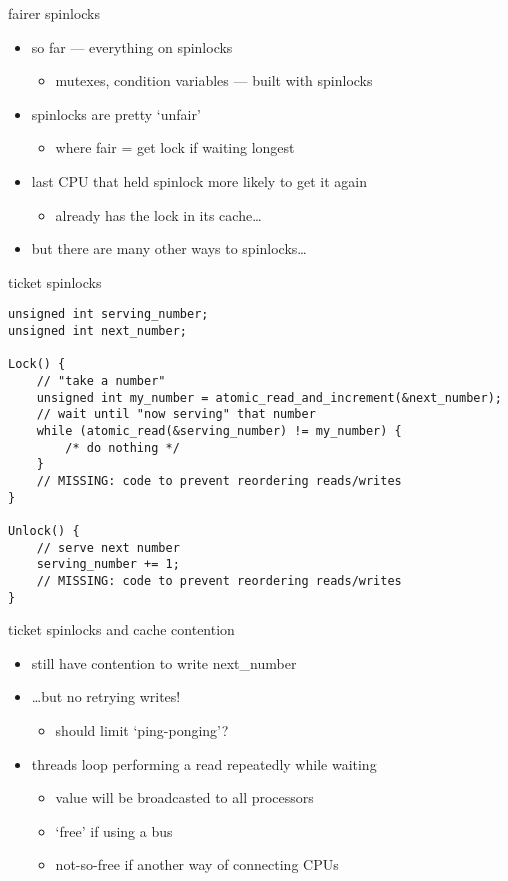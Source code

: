 \begin{frame}{fairer spinlocks}
\begin{itemize}
\item so far --- everything on spinlocks
    \begin{itemize}
    \item mutexes, condition variables --- built with spinlocks
    \end{itemize}
\item spinlocks are pretty `unfair'
    \begin{itemize}
    \item where fair = get lock if waiting longest
    \end{itemize}
\item last CPU that held spinlock more likely to get it again
    \begin{itemize}
    \item already has the lock in its cache\ldots
    \end{itemize}
\item but there are many other ways to spinlocks\ldots
\end{itemize}
\end{frame}

\begin{frame}[fragile,label=ticketLock]{ticket spinlocks}
\begin{lstlisting}
unsigned int serving_number;
unsigned int next_number;

Lock() {
    // "take a number"
    unsigned int my_number = atomic_read_and_increment(&next_number);
    // wait until "now serving" that number
    while (atomic_read(&serving_number) != my_number) {
        /* do nothing */
    }
    // MISSING: code to prevent reordering reads/writes
}

Unlock() {
    // serve next number
    serving_number += 1;
    // MISSING: code to prevent reordering reads/writes
}
\end{lstlisting}
\end{frame}

\begin{frame}{ticket spinlocks and cache contention}
\begin{itemize}
\item still have contention to write next\_number
\item \ldots but no retrying writes!
    \begin{itemize}
    \item should limit `ping-ponging'?
    \end{itemize}
\item threads loop performing a read repeatedly while waiting
    \begin{itemize}
    \item value will be broadcasted to all processors
    \item `free' if using a bus
    \item not-so-free if another way of connecting CPUs
    \end{itemize}
\end{itemize}
\end{frame}

